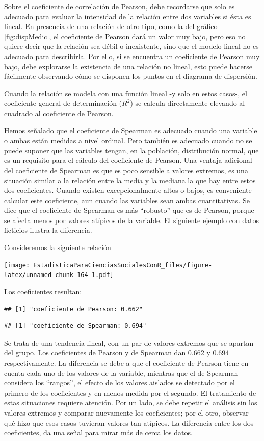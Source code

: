 \documentclass[]{book}
\begin{document}
Sobre el coeficiente de correlación de Pearson, debe recordarse que solo
es adecuado para evaluar la intensidad de la relación entre dos
variables si ésta es lineal. En presencia de una relación de otro tipo,
como la del gráfico \ref{fig:dispMedic}, el coeficiente de Pearson dará un valor muy bajo,
pero eso no quiere decir que la relación sea débil o inexistente, sino
que el modelo lineal no es adecuado para describirla. Por ello, si se
encuentra un coeficiente de Pearson muy bajo, debe explorarse la
existencia de una relación no lineal, esto puede hacerse fácilmente
observando cómo se disponen los puntos en el diagrama de dispersión.

Cuando la relación se modela con una función lineal -y solo en estos
casos-, el coeficiente general de determinación (\(R^2\)) se calcula
directamente elevando al cuadrado al coeficiente de Pearson.

Hemos señalado que el coeficiente de Spearman es adecuado cuando una
variable o ambas están medidas a nivel ordinal. Pero también es adecuado
cuando no se puede suponer que las variables tengan, en la población,
distribución normal, que es un requisito para el cálculo del coeficiente
de Pearson. Una ventaja adicional del coeficiente de Spearman es que es
poco sensible a valores extremos, es una situación similar a la relación
entre la media y la mediana la que hay entre estos dos coeficientes.
Cuando existen excepcionalmente altos o bajos, es conveniente calcular este coeficiente, aun cuando las variables sean ambas cuantitativas. Se
dice que el coeficiente de Spearman es más ``robusto'' que es de Pearson,
porque se afecta menos por valores atípicos de la variable. El siguiente ejemplo con datos ficticios ilustra la diferencia.

Consideremos la siguiente relación

\texttt{[image: EstadisticaParaCienciasSocialesConR\_files/figure-latex/unnamed-chunk-164-1.pdf]}

Los coeficientes resultan:

\begin{verbatim}
## [1] "coeficiente de Pearson: 0.662"
\end{verbatim}

\begin{verbatim}
## [1] "coeficiente de Spearman: 0.694"
\end{verbatim}

Se trata de una tendencia lineal, con un par de valores extremos que se apartan del
grupo. Los coeficientes de Pearson y de Spearman dan 0.662 y 0.694 respectivamente. La diferencia se debe a que el coeficiente de Pearson tiene en cuenta cada uno de los valores de la variable, mientras que el de Spearman considera los ``rangos'', el efecto de los valores aislados se detectado por el primero de los coeficientes y en menos medida por el segundo. El
tratamiento de estas situaciones requiere atención. Por un lado, se debe
repetir el análisis sin los valores extremos y comparar nuevamente los
coeficientes; por el otro, observar qué hizo que esos casos tuvieran valores tan atípicos. La diferencia entre los dos coeficientes, da una
señal para mirar más de cerca los datos.
\end{document}
